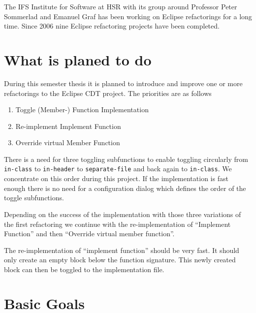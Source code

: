 \documentclass[a4paper,12pt]{scrreprt}
\begin{document}
The IFS Institute for Software at HSR with its group around Professor Peter
Sommerlad and
Emanuel Graf has been working on Eclipse refactorings for a long time. Since
2006 nine Eclipse refactoring projects have been completed.\newline

\section{What is planed to do}

During this semester thesis it is planned to introduce and improve one or more
refactorings to the Eclipse CDT project. The priorities are as follows

\begin{enumerate}
\item Toggle (Member-) Function Implementation
\item Re-implement Implement Function
\item Override virtual Member Function
\end{enumerate}

There is a need for three toggling subfunctions to enable toggling circularly
from \texttt{in-class}
to \texttt{in-header} to \texttt{separate-file}  and back again to
\texttt{in-class}. We concentrate on this order during this project. If the
implementation is fast enough there is no need for a configuration dialog which
defines the order of the toggle subfunctions.\newline

Depending on the success of the implementation with those three variations of
the
first refactoring we continue with the re-implementation of  ``Implement
Function'' and then ``Override virtual member function''.\newline

The re-implementation of ``implement function'' should be very fast. It should
only create an empty block below the function signature. This newly created
block can then be toggled to the implementation file.

\section{Basic Goals}
\end{document}
